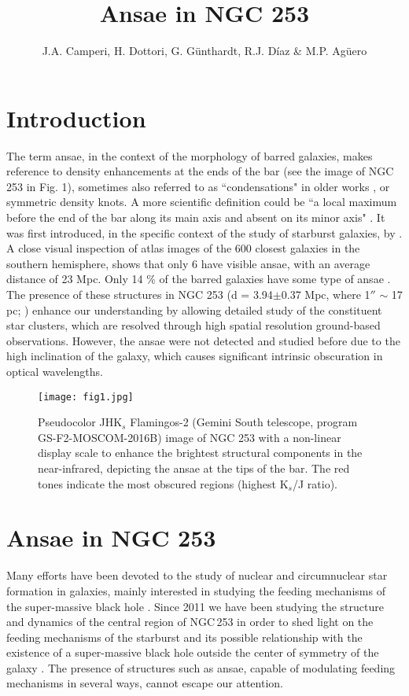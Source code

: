 \documentclass[baaa]{baaa}
\title{Ansae in NGC 253}
\author{
J.A. Camperi\inst{1},
H. Dottori\inst{4},
G. Günthardt\inst{1},
R.J. Díaz\inst{1,3}
\&
M.P. Agüero\inst{1,2}
}
\institute{
Observatorio Astron\'omico de C\'ordoba, UNC, Argentina 
\and
Consejo Nacional de Investigaciones Cient{\'\i}ficas y T\'ecnicas, Argentina
\and
Gemini Observatory, NSF's NOIRLab, EE.UU.
\and 
Instituto de Física, Universidade Federal do Rio Grande do Sul, Brasil
}
\begin{document}
\maketitle
\section{Introduction}\label{S_intro}

The term ansae, in the context of the morphology of barred galaxies, makes reference to density enhancements at the ends of the bar (see the image of NGC 253 in Fig. 1), sometimes also referred to as ``condensations" in older works \citep{1965AJ.....70..501D}, or symmetric density knots. A more scientific definition could be ``a local maximum before the end of the bar along its main axis and absent on its minor axis" \citep{2007AJ....134.1863M}. It was first introduced, in the specific context of the study of starburst galaxies, by \citet{1995AJ....110.1588B}. A close visual inspection of atlas images of the 600 closest galaxies in the southern hemisphere, shows that only 6 have visible ansae, with an average distance of 23 Mpc. Only 14 \% of the barred galaxies have some type of ansae \citep{2007AJ....134.1863M}. The presence of these structures in NGC 253 (d = 3.94$\pm$0.37 Mpc, where 1$''$ $\sim$ 17 pc; \citealt{2003A&A...404...93K}) enhance our understanding by allowing detailed study of the constituent star clusters, which are resolved through high spatial resolution ground-based observations. However, the ansae were not detected and studied before due to the high inclination of the galaxy, which causes significant intrinsic obscuration in optical wavelengths.

\begin{figure}[!t]
\centering
\texttt{[image: fig1.jpg]}
\caption{Pseudocolor JHK$_{s}$ Flamingos-2 (Gemini South telescope, program GS-F2-MOSCOM-2016B) image of NGC 253 with a non-linear display scale to enhance the brightest structural components in the near-infrared, depicting the ansae at the tips of the bar. The red tones indicate the most obscured regions (highest K$_{s}$/J ratio).}
\label{Figura}
\end{figure}

\section{Ansae in NGC 253}

Many efforts have been devoted to the study of nuclear and circumnuclear star formation in galaxies, mainly interested in studying the feeding mechanisms of the super-massive black hole \citep[e.g.][]{2014ApJ...780...86E,2016IJAA....6..219A,2016MNRAS.461.4192R}. 
Since 2011 we have been studying the structure and dynamics of the central region of NGC\,253 in order to shed light on the feeding mechanisms of the starburst and its possible relationship with the existence of a super-massive black hole outside the center of symmetry of the galaxy \citep{2012BAAA...55..253C,2015BAAA...57...28C}.
The presence of structures such as ansae, capable of modulating feeding mechanisms in several ways, cannot escape  our attention.
\end{document}
